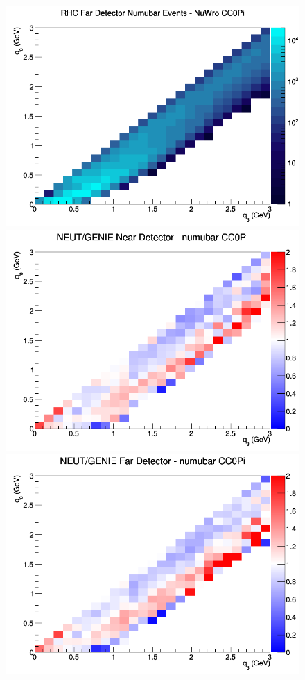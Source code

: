 \documentclass[12pt]{article}
\begin{document}
\begin{figure}[h]
\endminipage
{}
\includegraphics[width=\linewidth]{q0_q3/nominal/CC0Pi_RHC_FD_numubar_q3_q0_NuWro.png}
\endminipage
\newline
{}
\includegraphics[width=\linewidth]{q0_q3/nominal/ratios/CC0Pi_NEUT_GENIE_numubar_near_q3_q0.png}
\endminipage
{}
\includegraphics[width=\linewidth]{q0_q3/nominal/ratios/CC0Pi_NEUT_GENIE_numubar_far_q3_q0.png}

\end{figure}
\end{document}
